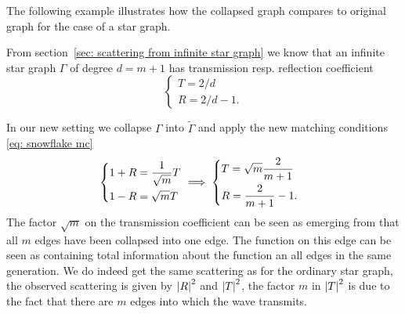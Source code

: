 The following example illustrates how the collapsed graph compares to original graph for the case of a star graph.

\begin{example}
  From section~\ref{sec: scattering from infinite star graph} we know that an infinite star graph $\Gamma$ of degree $d = m+1$ has transmission resp. reflection coefficient
  \begin{equation*}
    \begin{cases}
      T = 2/d \\
      R = 2/d - 1.
    \end{cases}
  \end{equation*}
  \begin{figure}[!h]
    \centering
  \end{figure}
  In our new setting we collapse $\Gamma$ into $\widetilde{\Gamma}$ and apply the new matching conditions \eqref{eq: snowflake mc}
  \begin{align*}
    & \begin{dcases}
      1 + R = \frac{1}{\sqrt{m}} T \\
      1 - R = \sqrt{m} T
    \end{dcases}
    \implies
    \begin{dcases}
      T = \sqrt{m}\frac{2}{m+1} \\
      R = \frac{2}{m+1} - 1.
    \end{dcases}
  \end{align*}
  The factor $\sqrt{m}$ on the transmission coefficient can be seen as emerging from that all $m$ edges have been collapsed into one edge. The function on this edge can be seen as containing total information about the function an all edges in the same generation.
  We do indeed get the same scattering as for the ordinary star graph, the observed scattering is given by $\left\lvert R\right\rvert^2$ and $\left\lvert T\right\rvert^2$, the factor $m$ in $\left\lvert T\right\rvert^2$ is due to the fact that there are $m$ edges into which the wave transmits.
\end{example}

